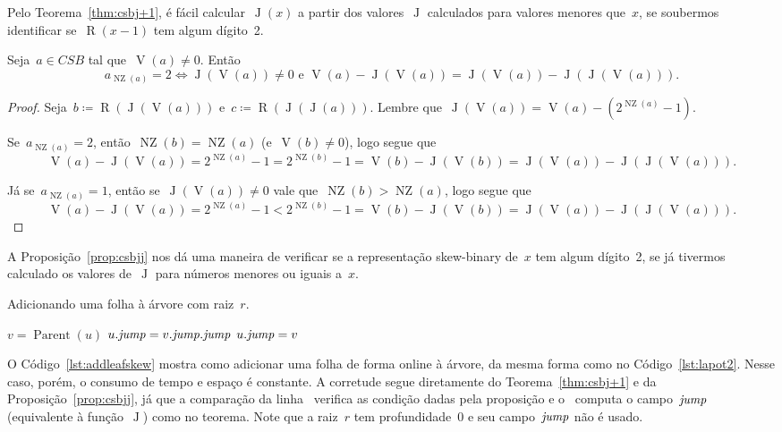 \documentclass[main.tex]{subfiles}
\newcommand{\Par}{\operatorname{Parent}}
\newcommand{\Dep}{\operatorname{D}}
\newcommand{\NZ}{\operatorname{NZ}}
\newcommand{\CSB}{\textit{CSB}}
\renewcommand{\V}{\operatorname{V}}
\newcommand{\R}{\operatorname{R}}
\newcommand{\J}{\operatorname{J}}
\begin{document}
Pelo Teorema~\ref{thm:csbj+1}, é fácil calcular~$\J(x)$ a partir dos valores~$\J$ calculados para valores menores que~$x$, se soubermos identificar se~$\R(x - 1)$ tem algum dígito~2.

\begin{proposition} \label{prop:csbjj}
	Seja~$a \in \CSB$ tal que~$\V(a) \neq 0$. Então \vspace{-2ex}
	$${a_{\NZ(a)} = 2 \iff \J(\V(a)) \neq 0 \text{ e } \V(a) - \J(\V(a)) = \J(\V(a)) - \J(\J(\V(a))).}$$
\end{proposition}
\begin{proof}
	Seja~$b \coloneqq \R(\J(\V(a)))$ e~${c \coloneqq \R(\J(\J(a)))}$. Lembre que~$\J(\V(a)) = \V(a) - (2^{\NZ(a)} - 1)$.

	Se~$a_{\NZ(a)} = 2$, então~$\NZ(b) = \NZ(a)$ (e~$\V(b) \neq 0$), logo segue que~$$\V(a) - \J(\V(a)) = 2^{\NZ(a)} - 1 = 2^{\NZ(b)} - 1 = \V(b) - \J(\V(b)) = \J(\V(a)) - \J(\J(\V(a))).$$

	Já se~$a_{\NZ(a)} = 1$, então se~$\J(\V(a)) \neq 0$ vale que~$\NZ(b) > \NZ(a)$, logo segue que~$$\V(a) - \J(\V(a)) = 2^{\NZ(a)} - 1 < 2^{\NZ(b)} - 1 = \V(b) - \J(\V(b)) = \J(\V(a)) - \J(\J(\V(a))).$$
\end{proof}

A Proposição~\ref{prop:csbjj} nos dá uma maneira de verificar se a representação skew-binary de~$x$ tem algum dígito~2, se já tivermos calculado os valores de~$\J$ para números menores ou iguais a~$x$.

\renewcommand{\root}{\mathit{root}}
\begin{algorithm}
\caption{Adicionando uma folha à árvore com raiz~$r$.} \label{lst:addleafskew}
\begin{algorithmic}[1]
		\State $v = \Par(u)$
		\If{$v.\jmp \neq r \textbf{ and } \Dep(v) - \Dep(v.\jmp) = \Dep(v.\jmp) - \Dep(v.\jmp.\jmp)$} \label{lst:addleafskew:if}
			\State $u.\mathit{jump} = v.\mathit{jump}.\mathit{jump}$
		\Else
			\State $u.\mathit{jump} = v$
		\EndIf
	\EndFunction
\end{algorithmic}
\end{algorithm}

O Código~\ref{lst:addleafskew} mostra como adicionar uma folha de forma online à árvore, da mesma forma como no Código~\ref{lst:lapot2}. Nesse caso, porém, o consumo de tempo e espaço é constante. A corretude segue diretamente do Teorema~\ref{thm:csbj+1} e da Proposição~\ref{prop:csbjj}, já que a comparação da linha~ verifica as condição dadas pela proposição e o~ computa o campo~$\mathit{jump}$ (equivalente à função~$\J$) como no teorema. Note que a raiz~$r$ tem profundidade~0 e seu campo~$\mathit{jump}$ não é usado.
\end{document}
